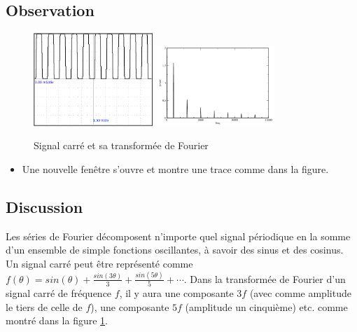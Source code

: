 \documentclass{book}
\begin{document}
\subsection{Observation}


\begin{figure}[h!]
\begin{center}
\caption{\label{fig:Squarewave-and-its}Signal carré et sa transformée de Fourier }\vspace{0.5em}
\includegraphics[width=0.4\textwidth, height=0.3\textwidth, keepaspectratio]{Schematic-sqr1000Hz.png}
\includegraphics[width=0.4\textwidth, height=0.3\textwidth, keepaspectratio]{Pic-sqr1000Hz-fft.png}
\end{center}
\end{figure}



\begin{itemize}
  \item Une nouvelle fenêtre s'ouvre et montre une trace comme dans la figure.
\end{itemize}

\subsection{Discussion}


Les séries de Fourier décomposent n'importe quel signal périodique en la somme d'un ensemble de simple fonctions oscillantes, à savoir des sinus et des cosinus. Un signal carré peut être représenté comme $f(\theta)=sin(\theta)+\frac{sin(3\theta)}{3}+\frac{sin(5\theta)}{5}+\cdots$. Dans la transformée de Fourier d'un signal carré de fréquence $f$, il y aura une composante $3f$  (avec comme amplitude le tiers de celle de $f$), une composante $5f$  (amplitude un cinquième) etc. comme montré dans la figure  \ref{fig:Squarewave-and-its}.
\end{document}
